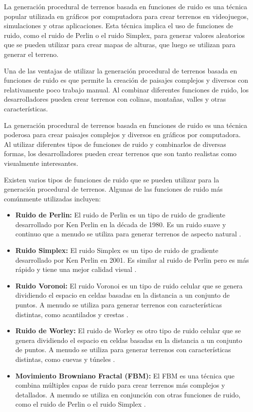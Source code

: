 La generación procedural de terrenos basada en funciones de ruido es una técnica popular utilizada en gráficos por computadora para crear terrenos en videojuegos, simulaciones y otras aplicaciones. Esta técnica implica el uso de funciones de ruido, como el ruido de Perlin o el ruido Simplex, para generar valores aleatorios que se pueden utilizar para crear mapas de alturas, que luego se utilizan para generar el terreno.

Una de las ventajas de utilizar la generación procedural de terrenos basada en funciones de ruido es que permite la creación de paisajes complejos y diversos con relativamente poco trabajo manual. Al combinar diferentes funciones de ruido, los desarrolladores pueden crear terrenos con colinas, montañas, valles y otras características.

La generación procedural de terrenos basada en funciones de ruido es una técnica poderosa para crear paisajes complejos y diversos en gráficos por computadora. Al utilizar diferentes tipos de funciones de ruido y combinarlos de diversas formas, los desarrolladores pueden crear terrenos que son tanto realistas como visualmente interesantes.

Existen varios tipos de funciones de ruido que se pueden utilizar para la generación procedural de terrenos. Algunas de las funciones de ruido más comúnmente utilizadas incluyen:

\begin{itemize}
    \item \textbf{Ruido de Perlin:} El ruido de Perlin es un tipo de ruido de gradiente desarrollado por Ken Perlin en la década de 1980. Es un ruido suave y continuo que a menudo se utiliza para generar terrenos de aspecto natural \cite{perlinnoise}.
    
    \item \textbf{Ruido Simplex:} El ruido Simplex es un tipo de ruido de gradiente desarrollado por Ken Perlin en 2001. Es similar al ruido de Perlin pero es más rápido y tiene una mejor calidad visual \cite{simplexnoise}.
    
    \item \textbf{Ruido Voronoi:} El ruido Voronoi es un tipo de ruido celular que se genera dividiendo el espacio en celdas basadas en la distancia a un conjunto de puntos. A menudo se utiliza para generar terrenos con características distintas, como acantilados y crestas \cite{voronoinoise}.
    
    \item \textbf{Ruido de Worley:} El ruido de Worley es otro tipo de ruido celular que se genera dividiendo el espacio en celdas basadas en la distancia a un conjunto de puntos. A menudo se utiliza para generar terrenos con características distintas, como cuevas y túneles \cite{worleynoise}.
    
    \item \textbf{Movimiento Browniano Fractal (FBM):} El FBM es una técnica que combina múltiples capas de ruido para crear terrenos más complejos y detallados. A menudo se utiliza en conjunción con otras funciones de ruido, como el ruido de Perlin o el ruido Simplex \cite{fbm}.
\end{itemize}

